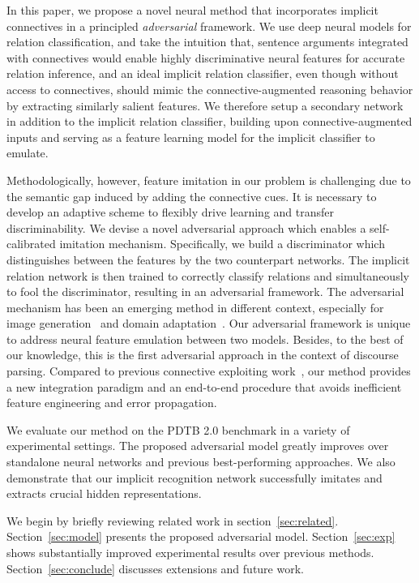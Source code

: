 \documentclass[11pt,a4paper]{article}
\begin{document}
In this paper, we propose a novel neural method that incorporates implicit connectives in a principled {\it adversarial} framework. We use deep neural models for relation classification, and take the intuition that, sentence arguments integrated with connectives would enable highly discriminative neural features for accurate relation inference, and an ideal implicit relation classifier, even though without access to connectives, should mimic the connective-augmented reasoning behavior by extracting similarly salient features. We therefore setup a secondary network in addition to the implicit relation classifier, building upon connective-augmented inputs and serving as a feature learning model for the implicit classifier to emulate. 

Methodologically, however, feature imitation in our problem is challenging due to the semantic gap induced by adding the connective cues. It is necessary to develop an adaptive scheme to flexibly drive learning and transfer discriminability. We devise a novel adversarial approach which enables a self-calibrated imitation mechanism. 
Specifically, we build a discriminator which distinguishes between the features by the two counterpart networks. The implicit relation network is then trained to correctly classify relations and simultaneously to fool the discriminator, resulting in an adversarial framework.
The adversarial mechanism has been an emerging method in different context, especially for image generation~\cite{goodfellow2014generative} and domain adaptation~\cite{ganin2016domain,chen2016adversarial}. Our adversarial framework is unique to address neural feature emulation between two models. Besides, to the best of our knowledge, this is the first adversarial approach in the context of discourse parsing. Compared to previous connective exploiting work~\cite{zhou2010predicting,xu2012connective}, our method provides a new integration paradigm and an end-to-end procedure that avoids inefficient feature engineering and error propagation.

We evaluate our method on the PDTB 2.0 benchmark in a variety of experimental settings. The proposed adversarial model greatly improves over standalone neural networks and previous best-performing approaches. We also demonstrate that our implicit recognition network successfully imitates and extracts crucial hidden representations.

We begin by briefly reviewing related work in section~\ref{sec:related}. Section~\ref{sec:model} presents the proposed adversarial model. Section~\ref{sec:exp} shows substantially improved experimental results over previous methods. Section~\ref{sec:conclude} discusses extensions and future work.
\end{document}

